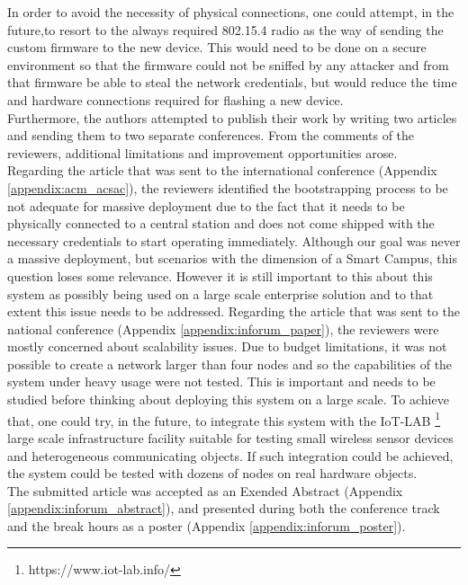 In order to avoid the necessity of physical connections, one could attempt, in the future,to resort to the always required 802.15.4 radio as the way of sending the custom firmware to the new device. This would need to be done on a secure environment so that the firmware could not be sniffed by any attacker and from that firmware be able to steal the network credentials, but would reduce the time and hardware connections required for flashing a new device.\\

Furthermore, the authors attempted to publish their work by writing two articles and sending them to two separate conferences. From the comments of the reviewers, additional limitations and improvement opportunities arose.\\
Regarding the article that was sent to the international conference (Appendix  \ref{appendix:acm_acsac}), the reviewers identified the bootstrapping process to be not adequate for massive deployment due to the fact that it needs to be physically connected to a central station and does not come shipped with the necessary credentials to start operating immediately. Although our goal was never a massive deployment, but scenarios with the dimension of a Smart Campus, this question loses some relevance. However it is still important to this about this system as possibly being used on a large scale enterprise solution and to that extent this issue needs to be addressed. 
Regarding the article that was sent to the national conference (Appendix \ref{appendix:inforum_paper}), the reviewers were mostly concerned about scalability issues. Due to budget limitations, it was not possible to create a network larger than four nodes and so the capabilities of the system under heavy usage were not tested. This is important and needs to be studied before thinking about deploying this system on a large scale. To achieve that, one could try, in the future, to integrate this system with the IoT-LAB \footnote{https://www.iot-lab.info/} large scale infrastructure facility suitable for testing small wireless sensor devices and heterogeneous communicating objects. If such integration could be achieved, the system could be tested with dozens of nodes on real hardware objects.\\
The submitted article was accepted as an Exended Abstract (Appendix \ref{appendix:inforum_abstract}), and presented during both the conference track and the break hours as a poster (Appendix \ref{appendix:inforum_poster}).

